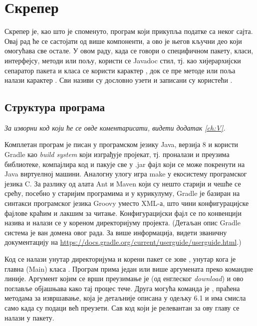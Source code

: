 \chapter{Скрепер}\label{ch:\thechapter}

Скрепер је, као што је споменуто, програм који прикупља податке са неког сајта. Овај рад ће се састојати од више компоненти, а ово је његов кључни део који омогућава све остале. У овом раду, када се говори о специфичном пакету, класи, интерфејсу, методи или пољу, користи се Javadoc стил, тј. као хијерархијски сепаратор пакета и класа се користи карактер , док се пре методе или поља налази карактер \code{\#}. Сви називи су дословно узети и записани су користећи .



\section{Структура програма}
\vspace*{-7mm}
\emph{За изворни код који ће се овде коментарисати, видети додатак \ref{ch:V}.}

Комплетан програм је писан у програмском језику Java, верзија 8 и користи Gradle као \emph{build system} који изграђује пројекат, тј. проналази и преузима библиотеке, компајлира код и пакује све у .jar фајл који се може покренути на Java виртуелној машини. Аналогну улогу игра make у екосистему програмског језика C. За разлику од алата Ant и Maven који су нешто старији и чешће се срећу, посебно у старијим програмима и у курикулуму, Gradle је базиран на синтакси програмског језика Groovy уместо XML-а, што чини конфигурацијске фајлове краћим и лакшим за читање. Конфигурацијски фајл се по конвенцији назива  и налази се у кореном директоријуму пројекта. (Детаљан опис Gradle система је ван домена овог рада. За више информација, видети званичну документацију на \url{https://docs.gradle.org/current/userguide/userguide.html}.)

Код се налази унутар директоријума  и корени пакет се зове , унутар кога је главна (Main) класа . Програм прима један или више аргумената преко командне линије. Аргумент којим се врши преузимање је  (од енглеског \textit{download}) и ово поглавље објашњава како тај процес тече. Друга могућа команда је , праћена методама за извршавање, која је детаљније описана у одељку 6.1 и има смисла само када су подаци већ преузети. Сав код који је релевантан за ову главу се налази у  пакету.



